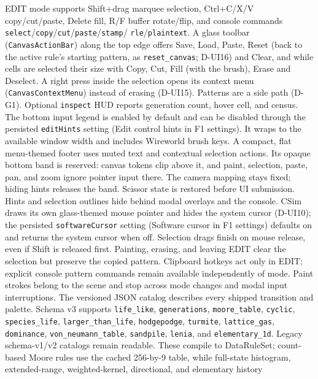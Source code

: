 EDIT mode supports Shift+drag marquee selection, Ctrl+C/X/V copy/cut/paste,
Delete fill, R/F buffer rotate/flip, and console commands
\texttt{select}/\texttt{copy}/\texttt{cut}/\texttt{paste}/\texttt{stamp}/
\texttt{rle}/\texttt{plaintext}. A glass toolbar
(\texttt{CanvasActionBar}) along the top edge offers Save, Load, Paste, Reset
(back to the active rule's starting pattern, as \texttt{reset\_canvas};
D-UI16) and Clear, and while cells are selected their size with Copy, Cut, Fill (with the
brush), Erase and Deselect. A right press inside the selection opens its
context menu (\texttt{CanvasContextMenu}) instead of erasing (D-UI15).
Patterns are a side path (D-G1). Optional
\texttt{inspect} HUD reports generation count, hover cell, and census.
The bottom input legend is enabled by default and can be disabled through
the persisted \texttt{editHints} setting (Edit control hints in F1 settings).
It wraps to the available window width and includes Wireworld brush keys.
A compact, flat menu-themed footer uses muted text and contextual selection
actions. Its opaque bottom band is reserved: canvas tokens clip above it, and
paint, selection, paste, pan, and zoom ignore pointer input there. The camera
mapping stays fixed; hiding hints releases the band. Scissor state is restored
before UI submission.
Hints and selection outlines hide behind modal overlays and the console.
CSim draws its own glass-themed mouse pointer and hides the system cursor
(D-UI10); the persisted \texttt{softwareCursor} setting (Software cursor in F1
settings) defaults on and returns the system cursor when off.
Selection drags finish on mouse release, even if Shift is released first.
Painting, erasing, and leaving EDIT clear the selection but preserve the
copied pattern. Clipboard hotkeys act only in EDIT; explicit console pattern
commands remain available independently of mode. Paint strokes belong to
the scene and stop across mode changes and modal input interruptions.
The versioned JSON catalog describes every shipped transition and palette.
Schema v3 supports \texttt{life\_like}, \texttt{generations},
\texttt{moore\_table}, \texttt{cyclic}, \texttt{species\_life},
\texttt{larger\_than\_life}, \texttt{hodgepodge}, \texttt{turmite},
\texttt{lattice\_gas}, \texttt{dominance}, \texttt{von\_neumann\_table},
\texttt{sandpile}, \texttt{lenia}, and \texttt{elementary\_1d}.
Legacy schema-v1/v2 catalogs remain readable. These compile to DataRuleSet;
count-based Moore rules use the cached 256-by-9 table, while full-state
histogram, extended-range, weighted-kernel, directional, and elementary history
